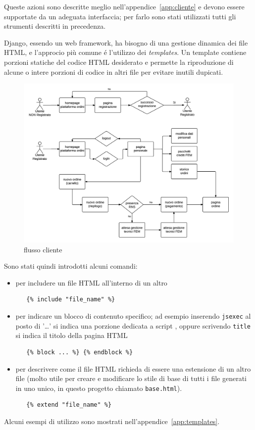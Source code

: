 Queste azioni sono descritte meglio nell'appendice~\ref{app:cliente} e devono essere supportate da un adeguata interfaccia; per farlo sono stati utilizzati tutti gli strumenti descritti in precedenza.

Django, essendo un web framework, ha bisogno di una gestione dinamica dei file HTML, e l'approcio più comune é l'utilizzo dei \emph{templates}.
Un template contiene porzioni statiche del codice HTML desiderato e permette la riproduzione di alcune o intere porzioni di codice in altri file per evitare inutili dupicati.

\begin{figure}
 \includegraphics[width=1\textwidth]{images/flusso-cliente} 
 \caption{flusso cliente}
 \label{fig:flusso-cliente}
\end{figure}

Sono stati quindi introdotti alcuni comandi:
\begin{itemize}
 \item per includere un file HTML all'interno di un altro
  \begin{verbatim} 
   {% include "file_name" %} 
  \end{verbatim}
 \item per indicare un blocco di contenuto specifico; ad esempio inserendo \texttt{jsexec} al posto di '{\dots}' si indica una porzione dedicata a script {\js}, oppure scrivendo \texttt{title} si indica il titolo della pagina HTML
  \begin{verbatim} 
   {% block ... %} {% endblock %}
  \end{verbatim}
 \item per descrivere come il file HTML richieda di essere una estensione di un altro file (molto utile per creare e modificare lo stile di base di tutti i file generati in uno unico, in questo progetto chiamato \texttt{base.html}).
  \begin{verbatim} 
   {% extend "file_name" %} 
  \end{verbatim} 
\end{itemize}
Alcuni esempi di utilizzo sono mostrati nell'appendice~\ref{app:templates}.

